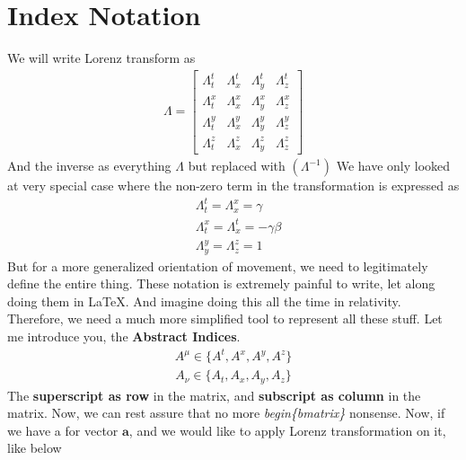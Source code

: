 \documentclass[11pt,letterpaper]{book}
\newcommand{\paren}[1]{\left( #1 \right)}
\newcommand{\etensor}[3]{#1_{#3}^{#2}}
\begin{document}
\section{Index Notation}
We will write Lorenz transform as
\begin{align}
\Lambda = \begin{bmatrix}
    \Lambda^{t}_{t}&\Lambda^{t}_{x}&\Lambda^{t}_{y}&\Lambda^{t}_{z}\\
    \Lambda^{x}_{t}&\Lambda^{x}_{x}&\Lambda^{x}_{y}&\Lambda^{x}_{z}\\
    \Lambda^{y}_{t}&\Lambda^{y}_{x}&\Lambda^{y}_{y}&\Lambda^{y}_z{}\\
    \Lambda^{z}_{t}&\Lambda^{z}_{x}&\Lambda^{z}_{y}&\Lambda^{z}_{z}
\end{bmatrix}
\end{align}
And the inverse as everything $\Lambda$ but replaced with $\paren{\Lambda^{-1}}$ We have only looked at very special case where the non-zero term in the transformation is expressed as
\begin{align}
&\etensor{\Lambda}{t}{t} = \etensor{\Lambda}{x}{x}=\gamma \\
&\etensor{\Lambda}{x}{t} = \etensor{\Lambda}{t}{x}= -\gamma\beta\\
&\etensor{\Lambda}{y}{y} =\etensor{\Lambda}{z}{z} = 1
\end{align}
But for a more generalized orientation of movement, we need to legitimately define the entire thing. These notation is extremely painful to write, let along doing them in \LaTeX. And imagine doing this all the time in relativity. Therefore, we need a much more simplified tool to represent all these stuff. Let me introduce you, the \textbf{Abstract Indices}.
\begin{align}
A^{\mu} \in \{A^{t}, A^{x},A^{y},A^{z}\}
\end{align}
\begin{align}
A_{\nu} \in \{A_{t},A_{x},A_{y},A_{z} \}
\end{align}
The \textbf{superscript as row} in the matrix, and \textbf{subscript as column} in the matrix. Now, we can rest assure that no more \textit{begin\{bmatrix\}} nonsense. 
Now, if we have a for vector $\mathbf{a}$, and we would like to apply Lorenz transformation on it, like below
\end{document}
